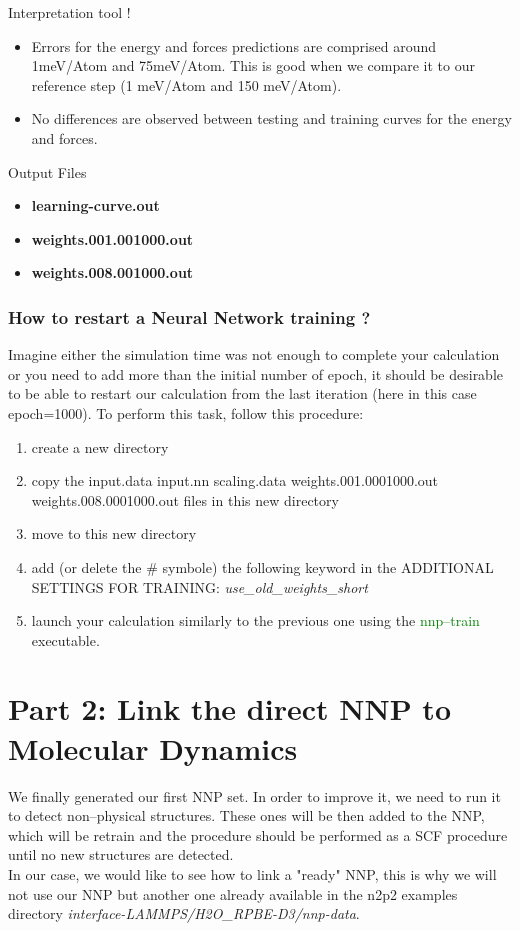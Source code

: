 \documentclass[12pt]{article}
\begin{document}
\begin{mybox1}{Interpretation tool !}
\begin{itemize}
    \item Errors for the energy and forces predictions are comprised around 1meV/Atom and 75meV/Atom. This is good when we compare it to our reference step (1 meV/Atom and 150 meV/Atom). 
    \item No differences are observed between testing and training curves for the energy and forces. 
\end{itemize}
\end{mybox1}

\begin{mybox3}{Output Files}
\begin{itemize}
    \item \textbf{learning-curve.out}
    \item \textbf{weights.001.001000.out}
    \item \textbf{weights.008.001000.out}
\end{itemize}
\end{mybox3}
%
\subsubsection{How to restart a Neural Network training ?}
%
Imagine either the simulation time was not enough to complete your calculation or you need to add more than the initial number of epoch, it should be desirable to be able to restart our calculation from the last iteration (here in this case epoch=1000). To perform this task, follow this procedure:
\begin{enumerate}
    \item create a new directory
    \item copy the input.data input.nn scaling.data weights.001.0001000.out weights.008.0001000.out files in this new directory
    \item move to this new directory
    \item add (or delete the \# symbole) the following keyword in the ADDITIONAL SETTINGS FOR TRAINING: \textit{use\_old\_weights\_short}
    \item launch your calculation similarly to the previous one using the \textcolor{green}{nnp--train} executable.
\end{enumerate}
%
%
%
\newpage
{}
\section{Part 2: Link the direct NNP to Molecular Dynamics}
We finally generated our first NNP set. In order to improve it, we need to run it to detect non--physical structures. These ones will be then added to the NNP, which will be retrain and the procedure should be performed as a SCF procedure until no new structures are detected. \\
In our case, we would like to see how to link a "ready" NNP, this is why we will not use our NNP but another one already available in the n2p2 examples directory \textit{interface-LAMMPS/H2O\_RPBE-D3/nnp-data}.
%
\end{document}
